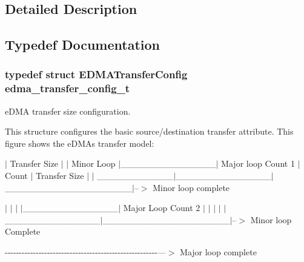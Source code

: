 \subsection{Detailed Description}


\subsection{Typedef Documentation}
\subsubsection[{\texorpdfstring{edma\+\_\+transfer\+\_\+config\+\_\+t}{edma_transfer_config_t}}]{\setlength{\rightskip}{0pt plus 5cm}typedef struct {\bf E\+D\+M\+A\+Transfer\+Config}  {\bf edma\+\_\+transfer\+\_\+config\+\_\+t}}\hypertarget{group__edma__hal_ga01fdc7ba04e6c4187630c6480746c40d}{}\label{group__edma__hal_ga01fdc7ba04e6c4187630c6480746c40d}


e\+D\+MA transfer size configuration. 

This structure configures the basic source/destination transfer attribute. This figure shows the e\+D\+MA\textquotesingle{}s transfer model\+: 

 $\vert$ Transfer Size $\vert$ $\vert$ Minor Loop $\vert$\+\_\+\+\_\+\+\_\+\+\_\+\+\_\+\+\_\+\+\_\+\+\_\+\+\_\+\+\_\+\+\_\+\+\_\+\+\_\+\+\_\+\+\_\+$\vert$ Major loop Count 1 $\vert$ Count $\vert$ Transfer Size $\vert$ $\vert$ \+\_\+\+\_\+\+\_\+\+\_\+\+\_\+\+\_\+\+\_\+\+\_\+\+\_\+\+\_\+\+\_\+\+\_\+$\vert$\+\_\+\+\_\+\+\_\+\+\_\+\+\_\+\+\_\+\+\_\+\+\_\+\+\_\+\+\_\+\+\_\+\+\_\+\+\_\+\+\_\+\+\_\+$\vert$\+\_\+\+\_\+\+\_\+\+\_\+\+\_\+\+\_\+\+\_\+\+\_\+\+\_\+\+\_\+\+\_\+\+\_\+\+\_\+\+\_\+\+\_\+\+\_\+\+\_\+\+\_\+\+\_\+\+\_\+$\vert$--$>$ Minor loop complete 

 $\vert$ $\vert$ $\vert$ $\vert$\+\_\+\+\_\+\+\_\+\+\_\+\+\_\+\+\_\+\+\_\+\+\_\+\+\_\+\+\_\+\+\_\+\+\_\+\+\_\+\+\_\+\+\_\+$\vert$ Major Loop Count 2 $\vert$ $\vert$ $\vert$ $\vert$ $\vert$\+\_\+\+\_\+\+\_\+\+\_\+\+\_\+\+\_\+\+\_\+\+\_\+\+\_\+\+\_\+\+\_\+\+\_\+\+\_\+\+\_\+\+\_\+$\vert$\+\_\+\+\_\+\+\_\+\+\_\+\+\_\+\+\_\+\+\_\+\+\_\+\+\_\+\+\_\+\+\_\+\+\_\+\+\_\+\+\_\+\+\_\+\+\_\+\+\_\+\+\_\+\+\_\+\+\_\+$\vert$--$>$ Minor loop Complete

-\/-\/-\/-\/-\/-\/-\/-\/-\/-\/-\/-\/-\/-\/-\/-\/-\/-\/-\/-\/-\/-\/-\/-\/-\/-\/-\/-\/-\/-\/-\/-\/-\/-\/-\/-\/-\/-\/-\/-\/-\/-\/-\/-\/-\/-\/-\/-\/-\/-\/-\/-\/-\/-\/---$>$ Major loop complete 

